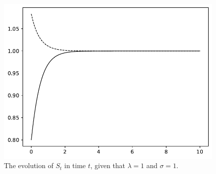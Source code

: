 \documentclass[mnsc]{informs3}
\begin{document}
\begin{figure}[!ht]
	\centering
	\includegraphics[scale=0.6]{figure_S_evolve.pdf}
	\caption{The evolution of $S_t$ in time $t$, given that $\lambda = 1$ and $\sigma = 1$.} \label{fig-S-evol}
\end{figure}
\end{document}
